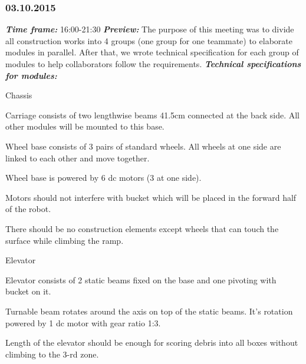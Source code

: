 \subsubsection{03.10.2015}
	\textit{\textbf{Time frame:}} 16:00-21:30 \newline
	\textit{\textbf{Preview:}} The purpose of this meeting was to divide all construction works into 4 groups (one group for one teammate) to elaborate modules in parallel. After that, we wrote technical specification for each group of modules to help collaborators follow the requirements. \newline \newline
	\textit{\textbf{Technical specifications for modules:}}
  \begin{enumerate*}
  	\item Chassis
  	\begin{enumerate*}
  		\item Carriage consists of two lengthwise beams 41.5cm connected at the back side. All other modules will be mounted to this base. 
  		
  		\item Wheel base consists of 3 pairs of standard wheels. All wheels at one side are linked to each other and move together.
  		
  		\item Wheel base is powered by 6 dc motors (3 at one side). 
  		
  		\item Motors should not interfere with bucket which will be placed in the forward half of the robot. 
  		
  		\item There should be no construction elements except wheels that can touch the surface while climbing the ramp. 
  		
  	\end{enumerate*}
  	
  	\item Elevator
  	\begin{enumerate*}
  		\item Elevator consists of 2 static beams fixed on the base and one pivoting with bucket on it.
  		
  		\item Turnable beam rotates around the axis on top of the static beams. It's rotation powered by 1 dc motor with gear ratio 1:3.
  		
  		\item Length of the elevator should be enough for scoring debris into all boxes without climbing to the 3-rd zone.
  	\end{enumerate*}
  	

\end{enumerate*}

